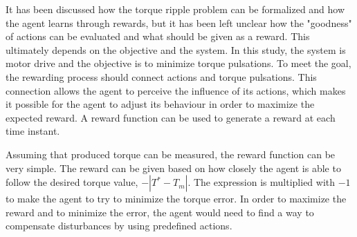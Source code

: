 It has been discussed how the torque ripple problem can be formalized and how the agent learns through rewards, but it has been left unclear how the "goodness" of actions can be evaluated and what should be given as a reward. This ultimately depends on the objective and the system. In this study, the system is motor drive and the objective is to minimize torque pulsations. To meet the goal, the rewarding process should connect actions and torque pulsations. This connection allows the agent to perceive the influence of its actions, which makes it possible for the agent to adjust its behaviour in order to maximize the expected reward. A reward function can be used to generate a reward at each time instant.

Assuming that produced torque can be measured, the reward function can be very simple. The reward can be given based on how closely the agent is able to follow the desired torque value, $-|T^* - T_m|$. The expression is multiplied with $-1$ to make the agent to try to minimize the torque error. In order to maximize the reward and to minimize the error, the agent would need to find a way to compensate disturbances by using predefined actions.

